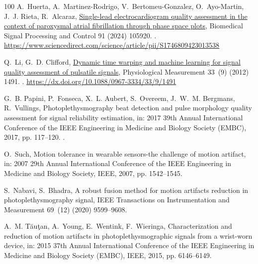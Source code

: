 \documentclass[final,3p,times,twocolumn]{elsarticle}
\begin{document}
\begin{thebibliography}{100}
A.~Huerta, A.~Martinez-Rodrigo, V.~Bertomeu-Gonzalez, O.~Ayo-Martin, J.~J.
  Rieta, R.~Alcaraz,
  \href{https://www.sciencedirect.com/science/article/pii/S1746809423013538}{Single-lead
  electrocardiogram quality assessment in the context of paroxysmal atrial
  fibrillation through phase space plots}, Biomedical Signal Processing and
  Control 91 (2024) 105920.
\newblock \href {https://doi.org/https://doi.org/10.1016/j.bspc.2023.105920}
  {}.
\newline\urlprefix\url{https://www.sciencedirect.com/science/article/pii/S1746809423013538}

Q.~Li, G.~D. Clifford,
  \href{https://dx.doi.org/10.1088/0967-3334/33/9/1491}{Dynamic time warping
  and machine learning for signal quality assessment of pulsatile signals},
  Physiological Measurement 33~(9) (2012) 1491.
\newblock \href {https://doi.org/10.1088/0967-3334/33/9/1491}
  {}.
\newline\urlprefix\url{https://dx.doi.org/10.1088/0967-3334/33/9/1491}

G.~B. Papini, P.~Fonseca, X.~L. Aubert, S.~Overeem, J.~W.~M. Bergmans,
  R.~Vullings, Photoplethysmography beat detection and pulse morphology quality
  assessment for signal reliability estimation, in: 2017 39th Annual
  International Conference of the IEEE Engineering in Medicine and Biology
  Society (EMBC), 2017, pp. 117--120.
\newblock \href {https://doi.org/10.1109/EMBC.2017.8036776}
  {}.

O.~Such, Motion tolerance in wearable sensors-the challenge of motion artifact,
  in: 2007 29th Annual International Conference of the IEEE Engineering in
  Medicine and Biology Society, IEEE, 2007, pp. 1542--1545.

S.~Nabavi, S.~Bhadra, A robust fusion method for motion artifacts reduction in
  photoplethysmography signal, IEEE Transactions on Instrumentation and
  Measurement 69~(12) (2020) 9599--9608.

A.~M. T{\u{a}}u{\c{t}}an, A.~Young, E.~Wentink, F.~Wieringa, Characterization
  and reduction of motion artifacts in photoplethysmographic signals from a
  wrist-worn device, in: 2015 37th Annual International Conference of the IEEE
  Engineering in Medicine and Biology Society (EMBC), IEEE, 2015, pp.
  6146--6149.


\end{thebibliography}
\end{document}
